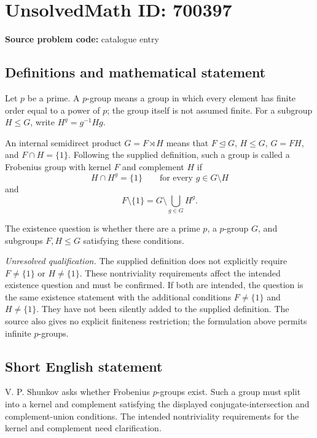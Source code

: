 \documentclass[11pt]{article}
\begin{document}
\section*{UnsolvedMath ID: 700397}
\textbf{Source problem code:} catalogue entry
\subsection{Definitions and mathematical statement}
Let \(p\) be a prime. A \(p\)-group means a group in which every element has finite order equal to a power of \(p\); the group itself is not assumed finite. For a subgroup \(H\leq G\), write \(H^g=g^{-1}Hg\).

An internal semidirect product \(G=F\rtimes H\) means that \(F\trianglelefteq G\), \(H\leq G\), \(G=FH\), and \(F\cap H=\{1\}\). Following the supplied definition, such a group is called a Frobenius group with kernel \(F\) and complement \(H\) if
\[
H\cap H^g=\{1\}\qquad\text{for every }g\in G\setminus H
\]
and
\[
F\setminus\{1\}=G\setminus\bigcup_{g\in G}H^g.
\]

The existence question is whether there are a prime \(p\), a \(p\)-group \(G\), and subgroups \(F,H\leq G\) satisfying these conditions.

\emph{Unresolved qualification.} The supplied definition does not explicitly require \(F\neq\{1\}\) or \(H\neq\{1\}\). These nontriviality requirements affect the intended existence question and must be confirmed. If both are intended, the question is the same existence statement with the additional conditions \(F\neq\{1\}\) and \(H\neq\{1\}\). They have not been silently added to the supplied definition. The source also gives no explicit finiteness restriction; the formulation above permits infinite \(p\)-groups.
\subsection{Short English statement}
V. P. Shunkov asks whether Frobenius \(p\)-groups exist. Such a group must split into a kernel and complement satisfying the displayed conjugate-intersection and complement-union conditions. The intended nontriviality requirements for the kernel and complement need clarification.
\end{document}

